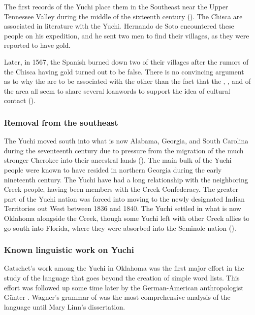 \documentclass[output=paper]{LSP/langsci}
\begin{document}
The first records of the Yuchi place them in the Southeast near the Upper Tennessee Valley during the middle of the sixteenth century (\citealt{Gatschet1885}). The Chisca are associated in literature with the Yuchi. Hernando de Soto encountered these people on his expedition, and he sent two men to find their villages, as they were reported to have gold. 

Later, in 1567, the Spanish burned down two of their villages after the rumors of the Chisca having gold turned out to be false. There is no convincing argument as to why the  are to be associated with the  other than the fact that the , , and  of the area all seem to share several loanwords to support the idea of cultural contact (\citet{BookerEtAl1992}).

\subsubsection{Removal from the southeast} 

The Yuchi moved south into what is now Alabama, Georgia, and South Carolina during the seventeenth century due to pressure from the migration of the much stronger Cherokee into their ancestral lands (\citealt{Jackson2012}). The main bulk of the Yuchi people were known to have resided in northern Georgia during the early nineteenth century. The Yuchi have had a long relationship with the neighboring Creek people, having been members with the Creek Confederacy. The greater part of the Yuchi nation was forced into moving to the newly designated Indian Territories out West between 1836 and 1840. The Yuchi settled in what is now Oklahoma alongside the Creek, though some Yuchi left with other Creek allies to go south into Florida, where they were absorbed into the Seminole nation (\citealt{Mithun1999}).

\subsubsection{Known linguistic work on Yuchi} 

Gatschet's \citeyear{Gatschet1885} work among the Yuchi in Oklahoma was the first major effort in the study of the  language that goes beyond the creation of simple word lists. This effort was followed up some time later by the German-American anthropologist G\"unter \citet{Wagner1934}. Wagner's  grammar of  was the most comprehensive analysis of the language until Mary Linn's \citeyear{Linn2000} dissertation.
\end{document}

